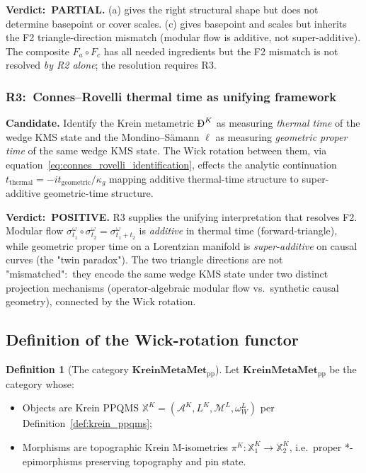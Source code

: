 \documentclass[11pt,a4paper]{article}
\theoremstyle{plain}
\theoremstyle{definition}
\newtheorem{definition}[theorem]{Definition}
\newcommand{\Acal}{\mathcal{A}}
\newcommand{\Mcal}{\mathcal{M}}
\newcommand{\BigDeth}{\text{\DJ}^{K}}
\newcommand{\KreinMM}{\mathbf{KreinMetaMet}_{\mathrm{pp}}}
\newcommand{\BWvac}{\omega_{W}^{L}}
\newcommand{\kappag}{\kappa_{g}}
\begin{document}
\textbf{Verdict:\ PARTIAL.} (a) gives the right structural shape
but does not determine basepoint or cover scales. (c) gives basepoint
and scales but inherits the F2 triangle-direction mismatch (modular
flow is additive, not super-additive). The composite $F_{a} \circ F_{c}$
has all needed ingredients but the F2 mismatch is not resolved
\emph{by R2 alone}; the resolution requires R3.

\subsubsection{R3:\ Connes--Rovelli thermal time as unifying
framework}\label{sec:r3_test}

\textbf{Candidate.} Identify the Krein metametric $\BigDeth$ as
measuring \emph{thermal time} of the wedge KMS state and the
Mondino--S\"amann $\ell$ as measuring \emph{geometric proper time} of
the same wedge KMS state. The Wick rotation between them, via
equation~\eqref{eq:connes_rovelli_identification}, effects the
analytic continuation $t_{\mathrm{thermal}} = -it_{\mathrm{geometric}}/\kappag$
mapping additive thermal-time structure to super-additive
geometric-time structure.

\textbf{Verdict:\ POSITIVE.} R3 supplies the unifying interpretation
that resolves F2. Modular flow $\sigma_{t_{1}}^{\omega} \circ
\sigma_{t_{2}}^{\omega} = \sigma_{t_{1} + t_{2}}^{\omega}$ is
\emph{additive} in thermal time (forward-triangle), while geometric
proper time on a Lorentzian manifold is \emph{super-additive} on
causal curves (the "twin paradox"). The two triangle directions are
not "mismatched":\ they encode the same wedge KMS state under two
distinct projection mechanisms (operator-algebraic modular flow vs.\
synthetic causal geometry), connected by the Wick rotation.

\subsection{Definition of the Wick-rotation functor}\label{sec:wick_functor_def}

\begin{definition}[The category $\KreinMM$]\label{def:cat_kreinmm}
Let $\KreinMM$ be the category whose:
\begin{itemize}
\item Objects are Krein PPQMS $\mathbb{X}^{K} = (\Acal^{K}, L^{K},
\Mcal^{L}, \BWvac)$ per Definition~\ref{def:krein_ppqms};
\item Morphisms are topographic Krein M-isometries
$\pi^{K} : \mathbb{X}^{K}_{1} \to \mathbb{X}^{K}_{2}$, i.e.\ proper
*-epimorphisms preserving topography and pin state.
\end{itemize}
\end{definition}
\end{document}
